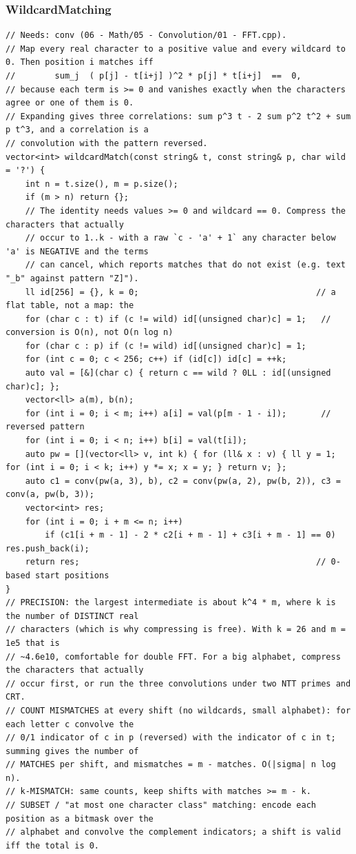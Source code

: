 \documentclass[9pt,a4paper,twocolumn]{extarticle}
\begin{document}
\subsubsection{WildcardMatching}
\nopagebreak
\begin{lstlisting}
// Needs: conv (06 - Math/05 - Convolution/01 - FFT.cpp).
// Map every real character to a positive value and every wildcard to 0. Then position i matches iff
//        sum_j  ( p[j] - t[i+j] )^2 * p[j] * t[i+j]  ==  0,
// because each term is >= 0 and vanishes exactly when the characters agree or one of them is 0.
// Expanding gives three correlations: sum p^3 t - 2 sum p^2 t^2 + sum p t^3, and a correlation is a
// convolution with the pattern reversed.
vector<int> wildcardMatch(const string& t, const string& p, char wild = '?') {
    int n = t.size(), m = p.size();
    if (m > n) return {};
    // The identity needs values >= 0 and wildcard == 0. Compress the characters that actually
    // occur to 1..k - with a raw `c - 'a' + 1` any character below 'a' is NEGATIVE and the terms
    // can cancel, which reports matches that do not exist (e.g. text "_b" against pattern "Z]").
    ll id[256] = {}, k = 0;                                    // a flat table, not a map: the
    for (char c : t) if (c != wild) id[(unsigned char)c] = 1;   // conversion is O(n), not O(n log n)
    for (char c : p) if (c != wild) id[(unsigned char)c] = 1;
    for (int c = 0; c < 256; c++) if (id[c]) id[c] = ++k;
    auto val = [&](char c) { return c == wild ? 0LL : id[(unsigned char)c]; };
    vector<ll> a(m), b(n);
    for (int i = 0; i < m; i++) a[i] = val(p[m - 1 - i]);       // reversed pattern
    for (int i = 0; i < n; i++) b[i] = val(t[i]);
    auto pw = [](vector<ll> v, int k) { for (ll& x : v) { ll y = 1; for (int i = 0; i < k; i++) y *= x; x = y; } return v; };
    auto c1 = conv(pw(a, 3), b), c2 = conv(pw(a, 2), pw(b, 2)), c3 = conv(a, pw(b, 3));
    vector<int> res;
    for (int i = 0; i + m <= n; i++)
        if (c1[i + m - 1] - 2 * c2[i + m - 1] + c3[i + m - 1] == 0) res.push_back(i);
    return res;                                                // 0-based start positions
}
// PRECISION: the largest intermediate is about k^4 * m, where k is the number of DISTINCT real
// characters (which is why compressing is free). With k = 26 and m = 1e5 that is
// ~4.6e10, comfortable for double FFT. For a big alphabet, compress the characters that actually
// occur first, or run the three convolutions under two NTT primes and CRT.
// COUNT MISMATCHES at every shift (no wildcards, small alphabet): for each letter c convolve the
// 0/1 indicator of c in p (reversed) with the indicator of c in t; summing gives the number of
// MATCHES per shift, and mismatches = m - matches. O(|sigma| n log n).
// k-MISMATCH: same counts, keep shifts with matches >= m - k.
// SUBSET / "at most one character class" matching: encode each position as a bitmask over the
// alphabet and convolve the complement indicators; a shift is valid iff the total is 0.
\end{lstlisting}
\end{document}
